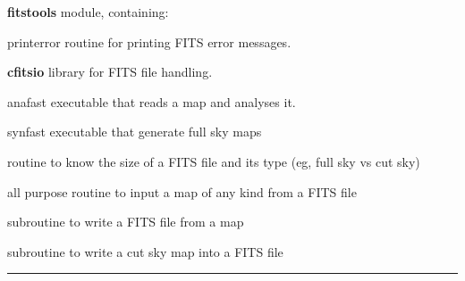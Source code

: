 \newpage
\begin{modules}
  \begin{sulist}{} %
  \item[\textbf{fitstools}] module, containing:
  \item[printerror] routine for printing FITS error messages.
  \item[\textbf{cfitsio}] library for FITS file handling.		
  \end{sulist}
\end{modules}

\begin{related}
  \begin{sulist}{} %
  \item[anafast] executable that reads a \healpix map and analyses it. 
  \item[synfast] executable that generate full sky \healpix maps
  \item[\htmlref{getsize\_fits}{sub:getsize_fits}] routine to know the size of a FITS file and its type (eg, full sky vs cut sky)
  \item[\htmlref{input\_map}{sub:input_map}] all purpose routine to input a map of any kind from a FITS file
  \item[\htmlref{output\_map}{sub:output_map}] subroutine to write a FITS file from a \healpix map
  \item[\htmlref{write\_fits\_cut4}{sub:write_fits_cut4}] subroutine to write a cut sky map into a FITS file
  \end{sulist}
\end{related}

\rule{\hsize}{2mm}

\newpage
